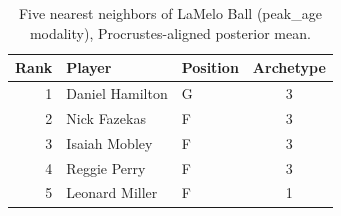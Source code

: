 \begin{table}[htbp]
  \centering\small
  \begin{tabular}{rllc}
    \toprule
    Rank & Player & Position & Archetype \\
    \midrule
    1 & Daniel Hamilton & G & 3 \\
    2 & Nick Fazekas & F & 3 \\
    3 & Isaiah Mobley & F & 3 \\
    4 & Reggie Perry & F & 3 \\
    5 & Leonard Miller & F & 1 \\
    \bottomrule
  \end{tabular}
  \caption{Five nearest neighbors of LaMelo Ball (peak_age modality), Procrustes-aligned posterior mean.}
  \label{tab:LaMelo_Ball_neighbors_peak_age}
\end{table}

